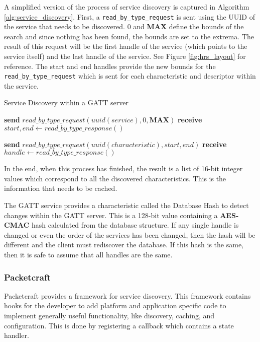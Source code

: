 A simplified version of the process of service discovery is captured in Algorithm \ref{alg:service_discovery}. First, a \texttt{read\_by\_type\_request} is sent using the UUID of the service that needs to be discovered. 0 and \textbf{MAX} define the bounds of the search and since nothing has been found, the bounds are set to the extrema. The result of this request will be the first handle of the service (which points to the service itself) and the last handle of the service. See Figure \ref{fig:hrs_layout} for reference. The start and end handles provide the new bounds for the \texttt{read\_by\_type\_request} which is sent for each characteristic and descriptor within the service.
\begin{algorithm}
    \caption{Service Discovery within a GATT server}
    \label{alg:service_discovery}
    \begin{algorithmic}[1] 
                \State \textbf{send} $\textit{read\_by\_type\_request}(\textit{uuid}(service), 0, \textbf{MAX})$
                \State \textbf{receive} $start,end \gets \textit{read\_by\_type\_response}()$

                    \State \textbf{send} $\textit{read\_by\_type\_request}(\textit{uuid}(characteristic), start, end)$
                    \State \textbf{receive} $handle \gets \textit{read\_by\_type\_response}()$
                \EndFor
            \EndFor
        \EndProcedure
    \end{algorithmic}
\end{algorithm}

In the end, when this process has finished, the result is a list of 16-bit integer values which correspond to all the discovered characteristics. This is the information that needs to be cached. 

The GATT service provides a characteristic called the Database Hash to detect changes within the GATT server. This is a 128-bit value containing a \textbf{AES-CMAC} hash calculated from the database structure. If any single handle is changed or even the order of the services has been changed, then the hash will be different and the client must rediscover the database. If this hash is the same, then it is safe to assume that all handles are the same.

\subsubsection{Packetcraft}
Packetcraft provides a framework for service discovery. This framework contains hooks for the developer to add platform and application specific code to implement generally useful functionality, like discovery, caching, and configuration. This is done by registering a callback which contains a state handler. 

